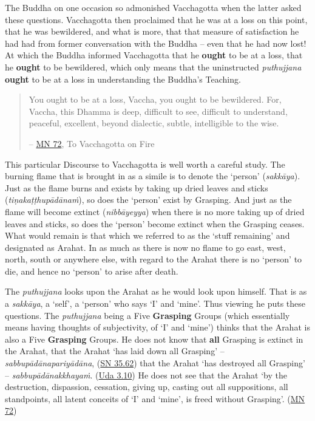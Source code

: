 The Buddha on one occasion so admonished Vacchagotta when the latter asked these questions. Vacchagotta then proclaimed that he was at a loss on this point, that he was bewildered, and what is more, that that measure of satisfaction he had had from former conversation with the Buddha -- even that he had now lost! At which the Buddha informed Vacchagotta that he \textbf{ought} to be at a loss, that he \textbf{ought} to be bewildered, which only means that the uninstructed \emph{puthujjana} \textbf{ought} to be at a loss in understanding the Buddha's Teaching.

\begin{quote}
You ought to be at a loss, Vaccha, you ought to be bewildered. For, Vaccha, this Dhamma is deep, difficult to see, difficult to understand, peaceful, excellent, beyond dialectic, subtle, intelligible to the wise.

 -- \href{https://suttacentral.net/mn72/en/thanissaro}{MN 72}, To Vacchagotta on Fire
\end{quote}

This particular Discourse to Vacchagotta is well worth a careful study. The burning flame that is brought in as a simile is to denote the `person' (\emph{sakkāya}). Just as the flame burns and exists by taking up dried leaves and sticks (\emph{tiṇakaṭṭhupādānaṁ}), so does the `person' exist by Grasping. And just as the flame will become extinct (\emph{nibbāyeyya}) when there is no more taking up of dried leaves and sticks, so does the `person' become extinct when the Grasping ceases. What would remain is that which we referred to as the `stuff remaining' and designated as Arahat. In as much as there is now no flame to go east, west, north, south or anywhere else, with regard to the Arahat there is no `person' to die, and hence no `person' to arise after death.

The \emph{puthujjana} looks upon the Arahat as he would look upon himself. That is as a \emph{sakkāya}, a `self', a `person' who says `I' and `mine'. Thus viewing he puts these questions. The \emph{puthujjana} being a Five \textbf{Grasping} Groups (which essentially means having thoughts of subjectivity, of `I' and `mine') thinks that the Arahat is also a Five \textbf{Grasping} Groups. He does not know that \textbf{all} Grasping is extinct in the Arahat, that the Arahat `has laid down all Grasping' -- \emph{sabbupādānapariyādāna}, (\href{https://suttacentral.net/sn35.62/en/bodhi}{SN 35.62}) that the Arahat `has destroyed all Grasping' -- \emph{sabbupādānakkhayaṁ}. (\href{https://suttacentral.net/ud3.10/en/anandajoti}{Uda 3.10}) He does not see that the Arahat `by the destruction, dispassion, cessation, giving up, casting out all suppositions, all standpoints, all latent conceits of `I' and `mine', is freed without Grasping'. (\href{https://suttacentral.net/mn72/en/thanissaro}{MN 72})

